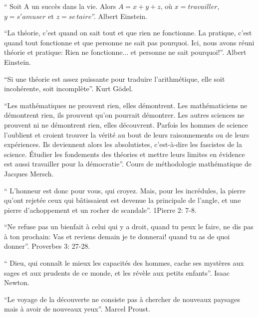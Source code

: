 \documentclass[11pt,a4paper,oneside]{book}
\begin{document}
\par\textquotedblleft
Soit A un succès dans la vie. Alors $ A=x+y+z $, où $ x = travailler $, $ y = s'amuser $ et
$ z = se\, taire $\textquotedblright. Albert Einstein.

\par\textquotedblleft La théorie, c'est quand on sait tout et que rien ne fonctionne. La pratique, c'est quand tout fonctionne et que personne  ne sait pas pourquoi. Ici, nous avons réuni théorie et pratique: Rien ne fonctionne... et personne ne sait pourquoi!\textquotedblright. Albert Einstein.

\par\textquotedblleft Si une théorie est assez puissante pour traduire l'arithmétique, elle soit incohérente, soit incomplète\textquotedblright. Kurt G\"{o}del.

\par\textquotedblleft Les mathématiques ne prouvent rien, elles démontrent. Les mathématiciens ne démontrent rien, ils prouvent qu'on pourrait démontrer. Les autres sciences ne prouvent ni ne démontrent rien, elles découvrent. Parfois les hommes de science l'oublient et croient trouver la vérité au bout de leurs raisonnements ou de leurs expériences. Ils deviennent alors les absolutistes, c'est-à-dire les fascistes de la science. Étudier les fondements des théories et mettre leurs limites en évidence est aussi travailler pour la démocratie\textquotedblright. Cours de méthodologie mathématique de Jacques Mersch.

\par\textquotedblleft
L'honneur est donc pour vous, qui croyez. Mais, pour les incrédules, la pierre qu'ont rejetée ceux qui bâtissaient est devenue la principale de l'angle, et une pierre d'achoppement et un rocher de scandale\textquotedblright. 1Pierre 2: 7-8. 

\par\textquotedblleft Ne refuse pas un bienfait à celui qui y a droit, quand tu peux le faire, ne dis pas à ton prochain: Vas et reviens demain je te donnerai! quand tu as de quoi donner\textquotedblright. Proverbes 3: 27-28. 

\par\textquotedblleft
 Dieu, qui connaît le mieux les capacités des hommes, cache ses mystères aux sages et aux prudents de ce monde, et les révèle aux petits enfants\textquotedblright. Isaac Newton.
 
 \textquotedblleft Le voyage de la découverte ne consiste pas à chercher de nouveaux paysages mais à avoir de nouveaux yeux\textquotedblright. Marcel Proust.
 
\end{document}
